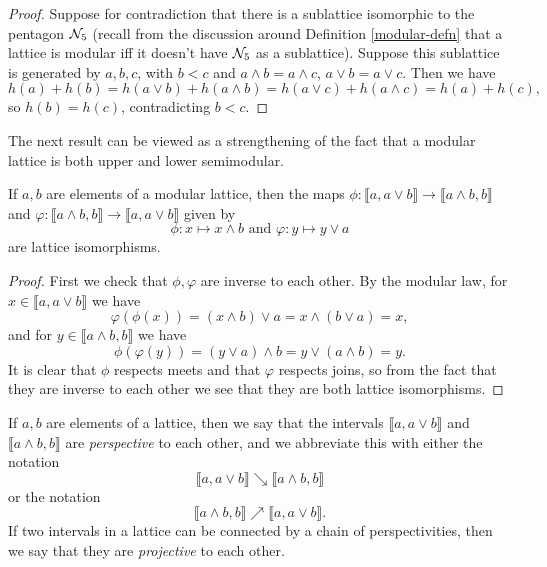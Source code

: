 \begin{appendices}
\begin{proof}
Suppose for contradiction that there is a sublattice isomorphic to the pentagon $\mathcal{N}_5$ (recall from the discussion around Definition \ref{modular-defn} that a lattice is modular iff it doesn't have $\mathcal{N}_5$ as a sublattice). Suppose this sublattice is generated by $a,b,c$, with $b < c$ and $a \wedge b = a \wedge c$, $a \vee b = a \vee c$. Then we have
\[
h(a) + h(b) = h(a\vee b) + h(a \wedge b) = h(a\vee c) + h(a \wedge c) = h(a) + h(c),
\]
so $h(b) = h(c)$, contradicting $b < c$.
\end{proof}

The next result can be viewed as a strengthening of the fact that a modular lattice is both upper and lower semimodular.%

\begin{thm}\label{diamond-isom-lattice} If $a,b$ are elements of a modular lattice, then the maps $\phi : \llbracket a, a\vee b\rrbracket \rightarrow \llbracket a\wedge b, b\rrbracket$ and $\varphi: \llbracket a\wedge b, b\rrbracket \rightarrow \llbracket a, a \vee b\rrbracket$ given by
\[
\phi : x \mapsto x\wedge b \text{ and } \varphi : y \mapsto y\vee a
\]
are lattice isomorphisms.
\end{thm}
\begin{proof} First we check that $\phi, \varphi$ are inverse to each other. By the modular law, for $x \in \llbracket a, a \vee b \rrbracket$ we have
\[
\varphi(\phi(x)) = (x \wedge b) \vee a = x \wedge (b \vee a) = x,
\]
and for $y \in \llbracket a \wedge b, b \rrbracket$ we have
\[
\phi(\varphi(y)) = (y \vee a) \wedge b = y \vee (a \wedge b) = y.
\]
It is clear that $\phi$ respects meets and that $\varphi$ respects joins, so from the fact that they are inverse to each other we see that they are both lattice isomorphisms.
\end{proof}

\begin{defn} If $a, b$ are elements of a lattice, then we say that the intervals $\llbracket a, a \vee b \rrbracket$ and $\llbracket a \wedge b, b\rrbracket$ are \emph{perspective} to each other, and we abbreviate this with either the notation
\[
\llbracket a, a \vee b \rrbracket \searrow \llbracket a \wedge b, b \rrbracket
\]
or the notation
\[
\llbracket a \wedge b, b \rrbracket \nearrow \llbracket a, a \vee b\rrbracket.
\]
If two intervals in a lattice can be connected by a chain of perspectivities, then we say that they are \emph{projective} to each other.
\end{defn}


\end{appendices}
